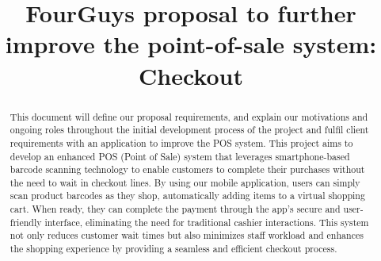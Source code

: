 \documentclass[conference]{IEEEtran}
\begin{document}
\title{FourGuys proposal to further improve the point-of-sale system: Checkout\\}

\author{

\and
{}

\and
{}

\and
{}
}

\maketitle

\begin{abstract}
 This document will define our proposal requirements, and explain our motivations and ongoing roles throughout the initial development process of the project and fulfil client requirements with an application to improve the POS system. This project aims to develop an enhanced POS (Point of Sale) system that leverages smartphone-based barcode scanning technology to enable customers to complete their purchases without the need to wait in checkout lines. By using our mobile application, users can simply scan product barcodes as they shop, automatically adding items to a virtual shopping cart. When ready, they can complete the payment through the app’s secure and user-friendly interface, eliminating the need for traditional cashier interactions. This system not only reduces customer wait times but also minimizes staff workload and enhances the shopping experience by providing a seamless and efficient checkout process. 
\end{abstract}
\end{document}
